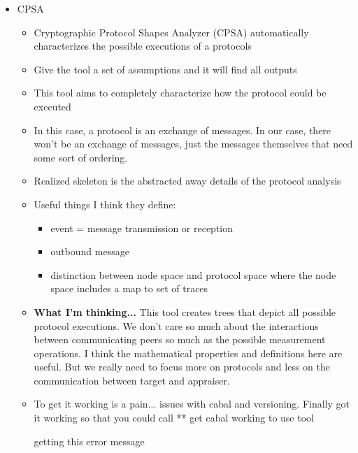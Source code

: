\documentclass[12pt, letterpaper]{article}
\begin{document}
\begin{itemize}
    \item CPSA 
    \begin{itemize}
        \item Cryptographic Protocol Shapes Analyzer (CPSA) automatically characterizes the possible executions of a protocols
        \item Give the tool a set of assumptions and it will find all outputs 
        \item This tool aims to completely characterize how the protocol could be executed
        \item In this case, a protocol is an exchange of messages. In our case, there won't be an exchange of messages, just the messages themselves that need some sort of ordering.
        \item Realized skeleton is the abstracted away details of the protocol analysis

        \item Useful things I think they define: 
        \begin{itemize}
            \item event = message transmission or reception 
            \item outbound message
            \item distinction between node space and protocol space where the node space includes a map to set of traces 
        \end{itemize}
        
        \item \textbf{What I'm thinking...} This tool creates trees that depict all possible protocol executions. We don't care so much about the interactions between communicating peers so much as the possible measurement operations. I think the mathematical properties and definitions here are useful. But we really need to focus more on protocols and less on the communication between target and appraiser. 


        \item To get it working is a pain...  issues with cabal and versioning. Finally got it working so that you could call ** get cabal working to use tool

        getting this error message 
        

\end{itemize}
\end{itemize}
\end{document}
